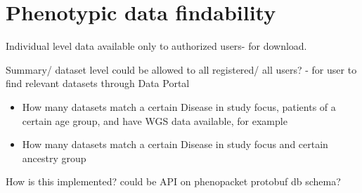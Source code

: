 \documentclass[a4paper, 10pt]{article}        %
\begin{document}
\section{Phenotypic data findability}

Individual level data available only to authorized users- for download.

Summary/ dataset level could be allowed to all registered/ all users? - for user to find relevant datasets through Data Portal
\begin{itemize} 
\item How many datasets match a certain Disease in study focus, patients of a certain age group, and have WGS data available, for example
\item How many datasets match a certain Disease in study focus and certain ancestry group
\end{itemize} 

How is this implemented? could be API on phenopacket protobuf db schema? 



\end{document}
